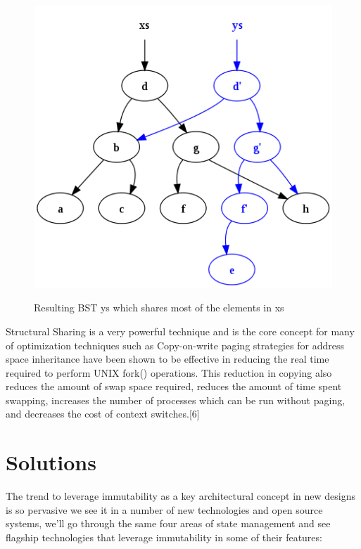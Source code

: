 \documentclass[12pt,twoside]{article}
\begin{document}
\begin{figure}[H]
    \begin{center}
        {\includegraphics[scale=.6]{structuralSharing.png}}
       \end{center}
       \caption{ \label{figure:2} Resulting BST ys which shares most of the elements in xs}
\end{figure}
Structural Sharing is a very powerful technique and is the core concept for many of optimization techniques such as Copy-on-write paging strategies for address space
inheritance have been shown to be effective in reducing the
real time required to perform UNIX fork() operations. This reduction in copying also reduces the amount of
swap space required, reduces the amount of time spent swapping, increases the number of processes which can be run
without paging, and decreases the cost of context switches.[6]


\newpage
\section{Solutions}


The trend to leverage immutability as a key architectural concept in new designs is so pervasive we see it in a number of new technologies and open source systems, we'll go through the same four areas of state management and see flagship technologies that leverage immutability in some of their features:
\end{document}
